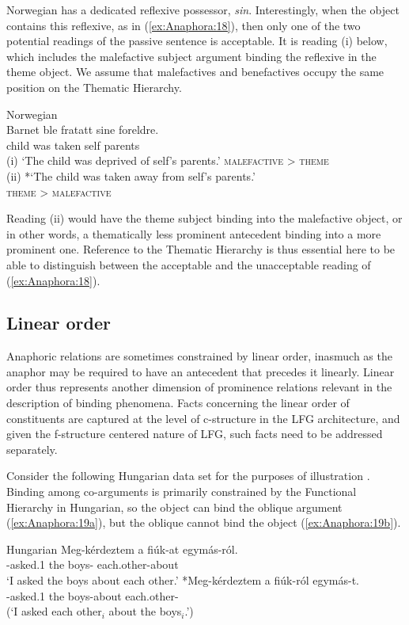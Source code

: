 \documentclass[output=paper,hidelinks]{langscibook}
\begin{document}
\noindent Norwegian has a dedicated reflexive possessor, \emph{sin}. Interestingly, when the object contains this reflexive, as in (\ref{ex:Anaphora:18}), then only one of the two potential readings of the passive sentence is acceptable. It is reading (i) below, which includes the malefactive subject argument binding the reflexive in the theme object. We assume that malefactives and benefactives occupy the same position on the Thematic Hierarchy.

\ea\label{ex:Anaphora:18} Norwegian \citep{Hellan88}\\
\gll
     Barnet  ble fratatt  sine  foreldre.\\
 child  was taken self parents\\
 \glt (i) `The child was deprived of self's parents.'     \textsc{malefactive > theme} \\
 (ii)   *`The child was taken away from self's parents.'\\
 \hfill\textsc{theme > malefactive} 
\z

\noindent Reading (ii) would have the theme subject binding into the malefactive object, or in other words, a thematically less prominent antecedent binding into a more prominent one. Reference to the Thematic Hierarchy is thus essential here to be able to distinguish between the acceptable and the unacceptable reading of (\ref{ex:Anaphora:18}).

\subsection{Linear order}
\label{sec:Anaphora:2.3}

Anaphoric relations are sometimes constrained by linear order, inasmuch as the anaphor may be required to have an antecedent that precedes it linearly. Linear order thus represents another dimension of prominence relations relevant in the description of binding phenomena. Facts concerning the linear order of constituents are captured at the level of c-structure in the LFG architecture, and given the f-structure centered nature of LFG, such facts need to be addressed  separately.

Consider the following Hungarian data set for the purposes of illustration \citep{Kiss2008-ls}. Binding among co-arguments is primarily constrained by the Functional Hierarchy in Hungarian, so the object can bind the oblique argument (\ref{ex:Anaphora:19a}), but the oblique cannot bind the object (\ref{ex:Anaphora:19b}).

\ea\label{ex:Anaphora:19} Hungarian \citep[451]{Kiss2008-ls}
\ea\label{ex:Anaphora:19a}\gll
Meg-kérdeztem  a   fiúk-at       egymás-ról.\\
 \PFV-asked.{1\SG}    the boys-{\ACC}  each.other-about\\
 \glt`I asked the boys about each other.'
\ex\label{ex:Anaphora:19b}\gll
     *Meg-kérdeztem  a   fiúk-ról        egymás-t.\\
 \PFV-asked.{1\SG}   the boys-about  each.other-{\ACC}\\
\glt (`I asked each other$_i$ about the boys$_i$.')
\z\z
\end{document}
